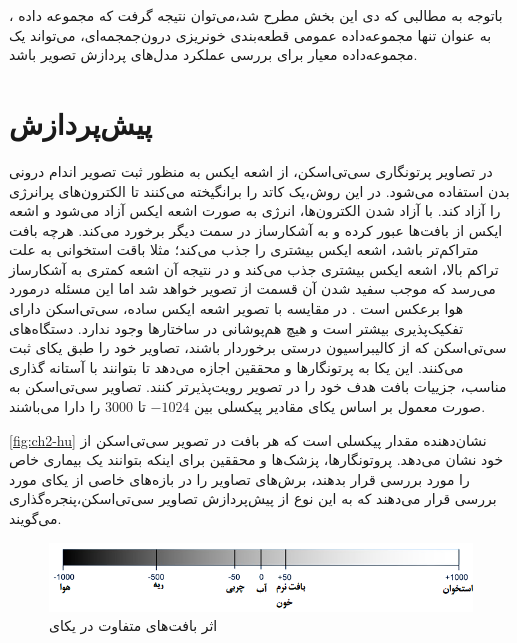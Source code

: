 باتوجه به مطالبی که دی این بخش مطرح شد،‌می‌توان نتیجه‌ گرفت که مجموعه داده
 ،
به عنوان تنها مجموعه‌داده عمومی قطعه‌بندی خونریزی درون‌جمجمه‌ای، می‌تواند یک مجموعه‌داده معیار برای بررسی عملکرد مدل‌های پردازش تصویر باشد. 


\section{پیش‌پردازش\protect{}}

در تصاویر پرتونگاری سی‌تی‌اسکن، از اشعه ایکس
 به منظور ثبت تصویر اندام درونی بدن استفاده می‌شود. در این روش،‌یک کاتد
را برانگیخته می‌کنند تا الکترون‌های
 پرانرژی را آزاد ‌کند. با آزاد شدن الکترون‌ها، انرژی به صورت اشعه ایکس آزاد می‌شود و اشعه ایکس از بافت‌ها عبور کرده و به آشکارساز در سمت دیگر برخورد می‌کند. هرچه بافت متراکم‌تر باشد، اشعه ایکس بیشتری را جذب می‌کند؛ مثلا باقت استخوانی به علت تراکم بالا،‌ اشعه ایکس بیشتری جذب می‌کند و در نتیجه آن اشعه کمتری به آشکارساز می‌رسد که موجب سفید شدن آن قسمت از تصویر خواهد شد اما این مسئله درمورد هوا برعکس است
 \cite{kaggleCTScansDICOM}.
در مقایسه با تصویر اشعه ایکس ساده، سی‌تی‌اسکن دارای تفکیک‌پذیری بیشتر است و هیچ هم‌پوشانی در ساختارها وجود ندارد.
دستگاه‌های سی‌تی‌اسکن که از کالیبراسیون
 درستی برخوردار باشند، تصاویر خود را طبق یکای 
ثبت می‌کنند. این یکا به پرتونگارها و محققین اجازه می‌دهد تا بتوانند با آستانه گذاری مناسب، جزییات بافت هدف خود را در تصویر رویت‌پذیرتر کنند. تصاویر سی‌تی‌اسکن به صورت معمول بر اساس یکای
 مقادیر پیکسلی بین $-1024$ تا 3000 را دارا می‌باشند.

\autoref{fig:ch2-hu}
نشان‌دهنده مقدار پیکسلی است که هر بافت در تصویر سی‌تی‌اسکن از خود نشان می‌دهد. پروتونگارها،‌ پزشک‌ها و محققین برای اینکه بتوانند یک بیماری خاص را مورد بررسی قرار بدهند، برش‌های تصاویر را در بازه‌های خاصی از یکای
مورد بررسی قرار می‌دهند که به این نوع از پیش‌پردازش تصاویر سی‌تی‌اسکن،‌پنجره‌گذاری
می‌گویند. 
\begin{figure}[h]
\centering
\includegraphics[width=1.0\linewidth]{Images/Chapter2/HU}
\caption{اثر بافت‌های متفاوت در یکای
 \cite{kaggleCTScansDICOM}}
\label{fig:ch2-hu}
\end{figure}

